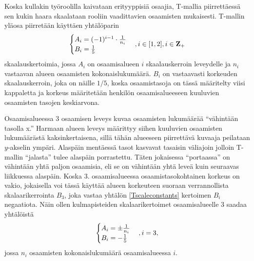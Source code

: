 \documentclass[a4paper,finnish,12pt]{article}
\begin{document}
Koska kullakin työroolilla kaivataan erityyppisiä osaajia, T-mallia piirrettäessä sen kukin haara skaalataan rooliin vaadittavien osaamisten mukaisesti. T-mallin yläosa piirretään käyttäen yhtälöparin
\begin{equation}
\begin{cases}
A_i = (-1)^{i-1} \cdot \frac{1}{n_i} \\
B_i = \frac{1}{5} \\
\end{cases} \\ , i \in [1,2], i \in \mathbf{Z}_{+}
\label{Tscaleconstants}
\end{equation} skaalauskertoimia, jossa $A_i$ on osaamisalueen $i$ skaalauskerroin leveydelle ja $n_i$ vastaavan alueen osaamisten kokonaislukumäärä. $B_i$ on vastaavasti korkeuden skaalauskerroin, joka on näille $1/5$, koska osaamistasoja on tässä määritelty viisi kappaletta ja korkeus määritetään henkilön osaamisalueeseen kuuluvien osaamisten tasojen keskiarvona.

Osaamisalueessa 3 osaamisen leveys kuvaa osaamisten lukumäärää ``vähintään tasolla x.'' Harmaan alueen leveys määrittyy siihen kuuluvien osaamisten lukumäärästä kaksinkertaisena, sillä tähän alueeseen piirrettävä kuvaaja peilataan $y$-akselin ympäri. Alaspäin mentäessä tasot kasvavat tasaisin väliajoin jolloin T-mallin ``jalasta'' tulee alaspäin porrastettu. Täten jokaisessa ``portaassa'' on vähintään yhtä paljon osaamisia, eli se on vähintään yhtä leveä kuin seuraavas liikkuessa alaspäin. Koska 3. osaamisalueessa osaamistasokohtainen korkeus on vakio, jokaisella voi tässä käyttää alueen korkeuteen suoraan verrannollista skalaarikerrointa $B_3$, joka vastaa yhtälön \eqref{Tscaleconstants} kertoimen $B_i$ negaatiota. Näin ollen kulmapisteiden skalaarikertoimet osaamisalueelle 3 saadaa yhtälöistä
\begin{equation}
\begin{cases}
A_i = \pm \frac{1}{n_i} \\
B_i = - \frac{1}{5} \\
\end{cases} \\ , i = 3,
\label{Tscaleconstants3}
\end{equation} jossa $n_i$ osaamisten kokonaislukumäärä osaamisalueessa $i$.
\end{document}
